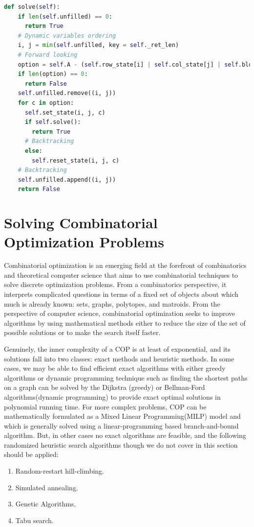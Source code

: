 \documentclass[../main.tex]{subfiles}
\begin{document}
\begin{enumerate}
\begin{lstlisting}[language=Python]
  def solve(self):
    if len(self.unfilled) == 0:
      return True
    # Dynamic variables ordering
    i, j = min(self.unfilled, key = self._ret_len)
    # Forward looking
    option = self.A - (self.row_state[i] | self.col_state[j] | self.block_state[i//3 ][j//3])
    if len(option) == 0:
      return False
    self.unfilled.remove((i, j))
    for c in option:
      self.set_state(i, j, c)
      if self.solve():
        return True
      # Backtracking
      else:
        self.reset_state(i, j, c)
    # Backtracking
    self.unfilled.append((i, j))
    return False
\end{lstlisting}
\end{enumerate}


\section{Solving Combinatorial Optimization Problems}

Combinatorial optimization is an emerging field at the forefront of combinatorics and theoretical computer science that aims to use combinatorial techniques to solve discrete optimization problems.  From a combinatorics perspective, it interprets complicated questions in terms of a fixed set of objects about which much is already known: sets, graphs, polytopes, and matroids. From the perspective of computer science, combinatorial optimization seeks to improve algorithms by using  mathematical methods either to reduce the size of the set of possible solutions or to make the search itself faster. 

Genuinely, the inner complexity of a COP is at least of exponential, and its solutions fall into two classes: exact methods and heuristic methods. In some cases, we may be able to find efficient exact algorithms with either greedy algorithms or dynamic programming technique such as finding the shortest paths on a graph can be solved by the Dijkstra (greedy) or Bellman-Ford algorithms(dynamic programming) to provide exact optimal solutions in polynomial running time. For more complex problems, COP can be mathematically formulated as a Mixed Linear Programming(MILP) model and which is generally solved using a linear-programming based branch-and-bound algorithm.  But, in other cases no exact algorithms are feasible, and the following randomized heuristic search algorithms though we do not cover in this section should be applied:
\begin{enumerate}
    \item Random-restart hill-climbing.
    \item Simulated annealing.
    \item Genetic Algorithms.
    \item Tabu search.
\end{enumerate}
\end{document}
